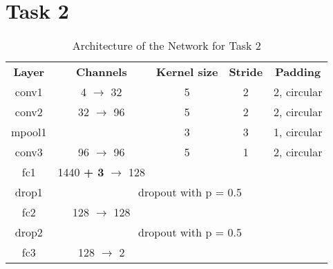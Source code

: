 \section{Task 2}

\begin{table}[htbp]
	\caption{Architecture of the Network for Task 2}
	\begin{center}
		\begin{tabular}{|c|c|c|c|c|}
			\hline
			\textbf{Layer}&\textbf{Channels} &\textbf{Kernel size} 
			&\textbf{Stride} &\textbf{Padding}\\
			\cline{1-5}
			conv1  &  4 $\rightarrow$ 	32 & 5 & 2 & 2, circular \\ \hline
			conv2  & 32 $\rightarrow$  	96 & 5 & 2 & 2, circular \\ \hline
			mpool1 & 					   & 3	& 3 & 1, circular \\ 
			\hline			
			conv3  & 96 $\rightarrow$  	96 & 5 & 1 & 2, circular \\ \hline
			fc1   &  1440 \textbf{+ 3} $\rightarrow$ 128 &  &  &  \\ \hline
			drop1 & \multicolumn{4}{c|}{dropout with p = 0.5} \\ \hline
			fc2   &  128 $\rightarrow$ 128 &  &  &  \\ \hline
			 drop2 & \multicolumn{4}{c|}{ dropout with p = 0.5} \\ \hline
			fc3 &  128 $\rightarrow$   2 &  &  &  \\ \hline
		\end{tabular}
		\label{tab: task 2}
	\end{center}
\end{table}
